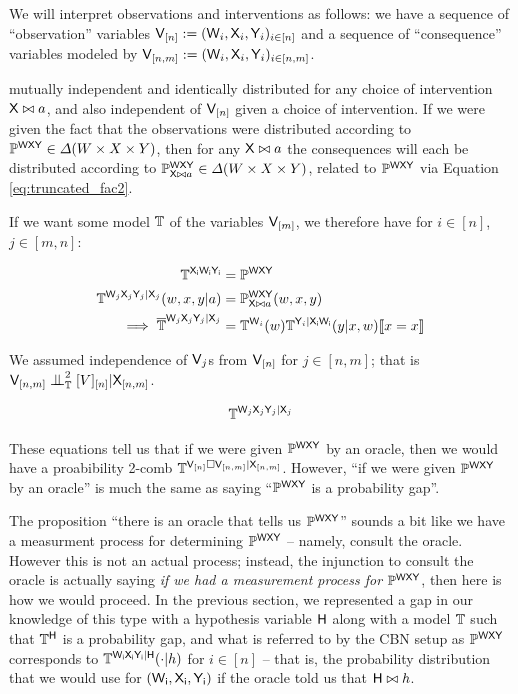 We will interpret observations and interventions as follows: we have a sequence of ``observation'' variables $\mathsf{V}_{[n]}:=(\mathsf{W}_i,\mathsf{X}_i,\mathsf{Y}_i)_{i\in [n]}$ and a sequence of ``consequence'' variables modeled by $\mathsf{V}_{[n,m]}:=(\mathsf{W}_i,\mathsf{X}_i,\mathsf{Y}_i)_{i\in [n,m]}$.


 mutually independent and identically distributed for any choice of intervention $\mathsf{X}\bowtie a$, and also independent of $\mathsf{V}_{[n]}$ given a choice of intervention. If we were given the fact that the observations were distributed according to $\mathbb{P}^{\mathsf{WXY}}\in \Delta(W\times X\times Y)$, then for any $\mathsf{X}\bowtie a$ the consequences will each be distributed according to $\mathbb{P}_{\mathsf{X}\bowtie a}^{\mathsf{W}\mathsf{X}\mathsf{Y}}\in \Delta(W\times X\times Y)$, related to $\mathbb{P}^{\mathsf{WXY}}$ via Equation \ref{eq:truncated_fac2}.



If we want some model $\mathbb{T}$ of the variables $\mathsf{V}_{[m]}$, we therefore have for $i\in [n]$, $j\in [m,n]$:

\begin{align}
    \mathbb{T}^{\mathsf{X_iW_iY_i}}&= \mathbb{P}^{\mathsf{WXY}}\\
    \mathbb{T}^{\mathsf{W}_j\mathsf{X}_j\mathsf{Y}_j|\mathsf{X}_j}(w,x,y|a) &= \mathbb{P}_{\mathsf{X}\bowtie a}^{\mathsf{W}\mathsf{X}\mathsf{Y}}(w,x,y)\\
    \implies \overline{\mathbb{T}}^{\mathsf{W}_j\mathsf{X}_j\mathsf{Y}_j|\mathsf{X}_j} &= \mathbb{T}^{\mathsf{W}_i}(w)\mathbb{T}^{\mathsf{Y}_i|\mathsf{X_iW_i}}(y|x,w)\llbracket x=x \rrbracket \label{eq:seedo_nohyp}
\end{align}



We assumed independence of $\mathsf{V}_j$s from $\mathsf{V}_{[n]}$ for $j\in [n,m]$; that is $\RV{V}_{[n,m]}\CI^2_{\prob{T}} \RV[V]_{[n]}|\RV{X}_{[n,m]}$. 

\begin{align}
    \mathbb{T}^{\mathsf{W}_j\mathsf{X}_j\mathsf{Y}_j|\mathsf{X}_j}
\end{align}

These equations tell us that if we were given $\mathbb{P}^{\mathsf{WXY}}$ by an oracle, then we would have a proabibility 2-comb $\mathbb{T}^{\mathsf{V}_{[n]}\square\mathsf{V}_{[n,m]}|\mathsf{X}_{[n,m]}}$. However, ``if we were given $\mathbb{P}^{\mathsf{WXY}}$ by an oracle'' is much the same as saying ``$\mathbb{P}^{\mathsf{WXY}}$ is a probability gap''. 



The proposition ``there is an oracle that tells us $\mathbb{P}^{\mathsf{WXY}}$'' sounds a bit like we have a measurment process for determining $\mathbb{P}^{\mathsf{WXY}}$ -- namely, consult the oracle. However this is not an actual process; instead, the injunction to consult the oracle is actually saying \emph{if we had a measurement process for} $\mathbb{P}^{\mathsf{WXY}}$, then here is how we would proceed. In the previous section, we represented a gap in our knowledge of this type with a hypothesis variable $\mathsf{H}$ along with a model $\mathbb{T}$ such that $\mathbb{T}^{\mathsf{H}}$ is a probability gap, and what is referred to by the CBN setup as $\mathbb{P}^{\mathsf{WXY}}$ corresponds to $\mathbb{T}^{\mathsf{W_iX_iY_i}|\mathsf{H}}(\cdot|h)$ for $i\in [n]$ -- that is, the probability distribution that we would use for $(\mathsf{W_i,X_i,Y_i})$ if the oracle told us that $\mathsf{H}\bowtie h$.

